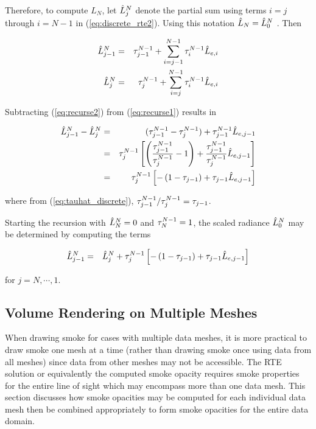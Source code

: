 Therefore, to compute $L_N$,
let $\hat{L}_{j}^N$ denote the partial sum using terms $i=j$ through $i=N-1$ in (\ref{eq:discrete_rte2}).  Using this notation $\hat{L}_N=\hat{L}_{0}^N$ . Then

\begin{eqnarray}
\label{eq:recurse1}
\hat{L}_{j-1}^N &= &\tau_{j-1}^{N-1} + \sum_{i=j-1}^{N-1}\tau_{i}^{N-1}\hat{L}_{e,i}\\
\label{eq:recurse2}
\hat{L}_{j}^N     &= &\tau_{j}^{N-1} + \sum_{i=j}^{N-1}  \tau_{i}^{N-1}\hat{L}_{e,i}
\end{eqnarray}

Subtracting (\ref{eq:recurse2}) from (\ref{eq:recurse1}) results in

\begin{eqnarray*}
\hat{L}_{j-1}^N -\hat{L}_{j}^N&= &(\tau_{j-1}^{N-1}-\tau_{j}^{N-1}) + \tau_{j-1}^{N-1}\hat{L}_{e,j-1}\\
                        &= &\tau_{j}^{N-1}\left[\left(\frac{\tau_{j-1}^{N-1}}{\tau_{j}^{N-1}}-1\right) + \frac{\tau_{j-1}^{N-1}}{\tau_{j}^{N-1}}\hat{L}_{e,j-1}\right]\\
                        &= &\tau_{j}^{N-1}\left[-\left(1-\tau_{j-1}\right) + \tau_{j-1}\hat{L}_{e,j-1}\right]
\end{eqnarray*}

where from (\ref{eq:tauhat_discrete}), $\tau_{j-1}^{N-1}/\tau_{j}^{N-1}=\tau_{j-1}$.  

Starting the recursion with 
$\hat{L}_{N}^N=0$ and $\tau_{N}^{N-1}=1$, the scaled radiance $\hat{L}_{0}^N$ may be determined by computing the terms

\begin{eqnarray}
\hat{L}_{j-1}^N &= &\hat{L}_{j}^N+\tau_{j}^{N-1}\left[-\left(1-\tau_{j-1}\right) + \tau_{j-1}\hat{L}_{e,j-1}\right]
\end{eqnarray}

for $j=N,\cdots,1$.

%
%

\subsection{Volume Rendering on Multiple Meshes}
When drawing smoke for cases with multiple data meshes, it is more practical to draw smoke one mesh at a time (rather than drawing smoke once using data from all meshes) since data from other meshes may not be accessible.  The RTE solution or equivalently the computed smoke opacity requires smoke properties for the entire line of sight which may encompass more than one data mesh.  This section discusses how smoke opacities may be computed for each individual data mesh then be combined appropriately to form smoke opacities for the entire data domain.


